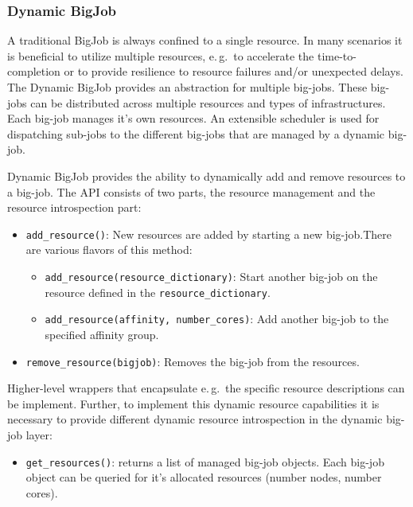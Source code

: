 \documentclass[]{article}
\begin{document}
\subsubsection{Dynamic BigJob}

\label{sec:dynamic_bigjob}
A traditional BigJob is always confined to a single resource. In many scenarios 
it is beneficial to utilize multiple resources, e.\,g.\ to accelerate the
time-to-completion or to provide resilience to resource failures and/or
unexpected delays. The Dynamic BigJob provides an abstraction for multiple
big-jobs. These big-jobs can be distributed across multiple resources and types
of infrastructures. Each big-job manages it's own resources. An extensible
scheduler is used for dispatching sub-jobs to the different big-jobs that are
managed by a dynamic big-job.


Dynamic BigJob provides the ability to dynamically add and remove resources to a 
big-job. The API consists of two parts, the resource management and the resource 
introspection part:
\begin{itemize}
    \item \texttt{add\_resource()}: New resources are added by starting a new
    big-job.There are various flavors of this method:
    \begin{itemize}
        \item \texttt{add\_resource(re\-sour\-ce\_dic\-tionary)}: Start another big-job on the resource defined in the \texttt{resource\_dictionary}.
        \item \texttt{add\_resource(affinity, number\_cores)}: Add another big-job to the specified affinity group.
    \end{itemize}
    \item \texttt{remove\_resource(bigjob)}: Removes the big-job from the
    resources.
\end{itemize}

Higher-level wrappers that encapsulate e.\,g.\ the specific resource
descriptions can be implement. Further, to implement this dynamic resource
capabilities it is necessary to provide different dynamic resource introspection
in the dynamic big-job layer:
\begin{itemize}
    \item \texttt{get\_resources()}: returns a list of managed big-job objects.
     Each big-job object can be queried for it's allocated resources (number 
     nodes, number cores).
\end{itemize}


\end{document}
